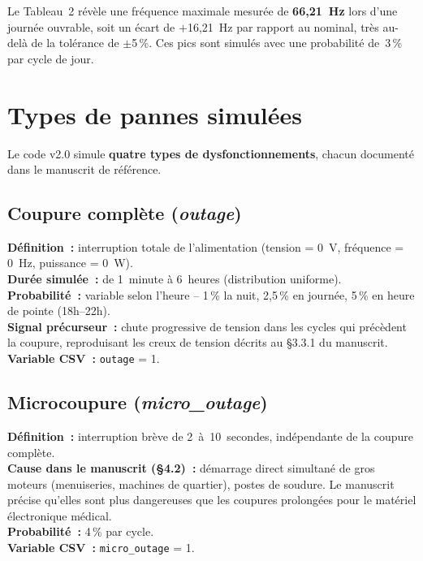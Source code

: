 \documentclass[12pt,a4paper]{article}
\begin{document}
Le Tableau~2 révèle une fréquence maximale mesurée de \textbf{66,21~Hz}
lors d'une journée ouvrable, soit un écart de $+$16,21~Hz par rapport
au nominal, très au-delà de la tolérance de $\pm$5\,\%.
Ces pics sont simulés avec une probabilité de~3\,\% par cycle de jour.

\section{Types de pannes simulées}
\label{sec:pannes}

Le code v2.0 simule \textbf{quatre types de dysfonctionnements},
chacun documenté dans le manuscrit de référence.

\subsection{Coupure complète (\emph{outage})}

\begin{mdframed}[style=encadre]
\textbf{Définition~:} interruption totale de l'alimentation (tension = 0~V,
fréquence = 0~Hz, puissance = 0~W).\\
\textbf{Durée simulée~:} de 1~minute à 6~heures (distribution uniforme).\\
\textbf{Probabilité~:} variable selon l'heure -- 1\,\% la nuit,
2,5\,\% en journée, 5\,\% en heure de pointe (18h--22h).\\
\textbf{Signal précurseur~:} chute progressive de tension dans les cycles
qui précèdent la coupure, reproduisant les creux de tension décrits
au §3.3.1 du manuscrit.\\
\textbf{Variable CSV~:} \texttt{outage} = 1.
\end{mdframed}

\subsection{Microcoupure (\emph{micro\_outage})}

\begin{mdframed}[style=encadre]
\textbf{Définition~:} interruption brève de 2~à~10~secondes,
indépendante de la coupure complète.\\
\textbf{Cause dans le manuscrit (§4.2)~:} démarrage direct simultané
de gros moteurs (menuiseries, machines de quartier), postes de soudure.
Le manuscrit précise qu'elles sont \og{}plus dangereuses que les coupures
prolongées\fg{} pour le matériel électronique médical.\\
\textbf{Probabilité~:} 4\,\% par cycle.\\
\textbf{Variable CSV~:} \texttt{micro\_outage} = 1.
\end{mdframed}
\end{document}
